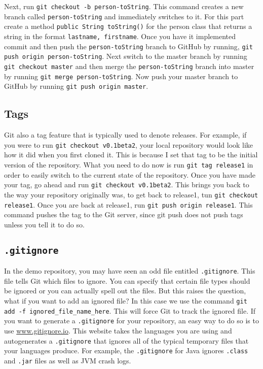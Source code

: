 \documentclass[notitlepage]{simple}
\begin{document}
Next, run \verb|git checkout -b person-toString|.
This command creates a new branch called
\linebreak\verb|person-toString| and immediately switches to it.
For this part create a method \verb|public String toString()| for the person class that returns a string in the format \verb|lastname, firstname|.
Once you have it implemented commit and then push the \verb|person-toString| branch to GitHub by running,
\linebreak\verb|git push origin person-toString|.
Next switch to the master branch by running \verb|git checkout master| and then merge the \verb|person-toString| branch into master by running \verb|git merge person-toString|.
Now push your master branch to GitHub by running \verb|git push origin master|.

\subsection{Tags}

Git also a tag feature that is typically used to denote releases.
For example, if you were to run \verb|git checkout v0.1beta2|, your local repository would look like how it did when you first cloned it.
This is because I set that tag to be the initial version of the repository.
What you need to do now is run \verb|git tag release1| in order to easily switch to the current state of the repository.
Once you have made your tag, go ahead and run \verb|git checkout v0.1beta2|.
This brings you back to the way your repository originally was, to get back to release1, tun \verb|git checkout release1|.
Once you are back at release1, run \verb|git push origin release1|.
This command pushes the tag to the Git server, since git push does not push tags unless you tell it to do so.

\subsection{\texttt{.gitignore}}

In the demo repository, you may have seen an odd file entitled \verb|.gitignore|.
This file tells Git which files to ignore.
You can specify that certain file types should be ignored or you can actually spell out the files.
But this raises the question, what if you want to add an ignored file?
In this case we use the command \verb|git add -f ignored_file_name_here|.
This will force Git to track the ignored file.
If you want to generate a \verb|.gitignore| for your repository, an easy way to do so is to use \url{www.gitignore.io}.
This website takes the languages you are using and autogenerates a \verb|.gitignore| that ignores all of the typical temporary files that your languages produce.
For example, the \verb|.gitignore| for Java ignores \verb|.class| and \verb|.jar| files as well as JVM crash logs.
\end{document}
